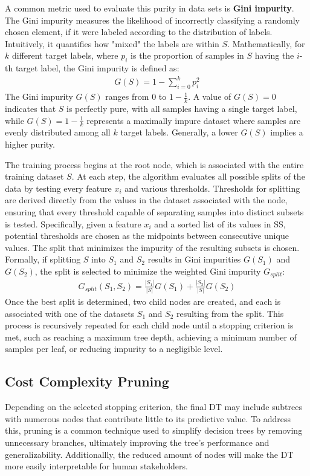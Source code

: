 A common metric used to evaluate this purity in data sets is \textbf{Gini impurity}.
The Gini impurity measures the likelihood of incorrectly classifying
a randomly chosen element, if it were labeled according to the distribution of labels.
Intuitively, it quantifies how "mixed" the labels are within $S$.
Mathematically, for $k$ different target labels,
where $p_i$ is the proportion of samples in $S$ having the $i$-th target label,
the Gini impurity is defined as:
\begin{align}
  G(S) = 1 - \sum_{i=0}^{k}p_i^2
\end{align}
The Gini impurity $G(S)$ ranges from $0$ to $1 - \frac{1}{k}$.
A value of $G(S) = 0$ indicates that $S$ is perfectly pure,
with all samples having a single target label,
while $G(S) = 1 - \frac{1}{k}$ represents a maximally impure dataset
where samples are evenly distributed among all $k$ target labels.
Generally, a lower $G(S)$ implies a higher purity.
\cite{gini}

The training process begins at the root node,
which is associated with the entire training dataset $S$.
At each step, the algorithm evaluates all possible splits of the data by testing every feature $x_i$
and various thresholds.
Thresholds for splitting are derived directly from the values in the dataset associated with the node,
ensuring that every threshold capable of separating samples into distinct subsets is tested.
Specifically, given a feature $x_i$ and a sorted list of its values in SS,
potential thresholds are chosen as the midpoints between consecutive unique values.
The split that minimizes the impurity of the resulting subsets is chosen.
Formally, if splitting $S$ into $S_1$ and $S_2$ results in Gini impurities $G(S_1)$ and $G(S_2)$,
the split is selected to minimize the weighted Gini impurity $G_{split}$:
\begin{align}
  G_{split}(S_1, S_2) = \frac{|S_1|}{|S|}G(S_1) + \frac{|S_2|}{|S|}G(S_2)
\end{align}
Once the best split is determined, two child nodes are created,
and each is associated with one of the datasets $S_1$ and $S_2$ resulting from the split.
This process is recursively repeated for each child node until a stopping criterion is met,
such as reaching a maximum tree depth, achieving a minimum number of samples per leaf,
or reducing impurity to a negligible level.

\subsection{Cost Complexity Pruning}
Depending on the selected stopping criterion,
the final DT may include subtrees with numerous nodes
that contribute little to its predictive value.
To address this, pruning is a common technique used to simplify decision trees
by removing unnecessary branches, ultimately improving the tree's performance and generalizability.
Additionallly, the reduced amount of nodes 
will make the DT more easily interpretable for human stakeholders.

